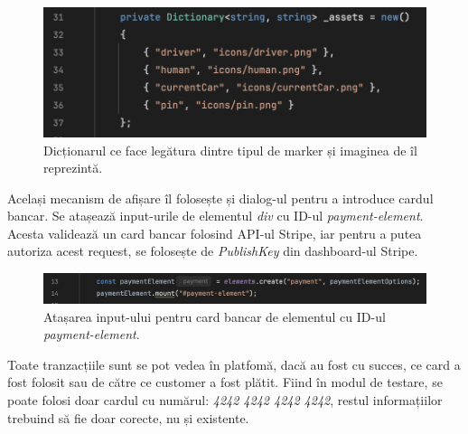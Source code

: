 \begin{figure}[H]
    \centering
    \includegraphics[width=14cm]{Assets/icons.png}
    \caption{Dicționarul ce face legătura dintre tipul de marker și imaginea de îl reprezintă.}
    \label{fig:icons}
\end{figure}

Același mecanism de afișare îl folosește și dialog-ul pentru a introduce cardul bancar.
Se atașează input-urile de elementul \textit{div} cu ID-ul \textit{payment-element}. Acesta
validează un card bancar folosind API-ul Stripe, iar pentru a putea autoriza acest request,
se folosește de \textit{PublishKey} din dashboard-ul Stripe.

\begin{figure}[H]
    \centering
    \includegraphics[width=16cm]{Assets/stripeMount.png}
    \caption{Atașarea input-ului pentru card bancar de elementul cu ID-ul \textit{payment-element}.}
    \label{fig:stripeMount}
\end{figure}

Toate tranzacțiile sunt se pot vedea în platfomă, dacă au fost cu succes, ce card a fost folosit sau de către ce customer a fost plătit.
Fiind în modul de testare, se poate folosi doar cardul cu numărul: \textit{4242 4242 4242 4242}, restul informațiilor
trebuind să fie doar corecte, nu și existente.

